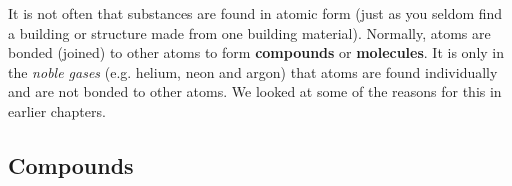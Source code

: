  \label{m38120*id307459}It is not often that substances are found in atomic form (just as you seldom find a building or structure made from one building material). Normally, atoms are bonded (joined) to other atoms to form \textbf{compounds} or \textbf{molecules}. It is only in the \textsl{noble gases} (e.g.\@{} helium, neon and argon) that atoms are found individually and are not bonded to other atoms. We looked at some of the  reasons for this in earlier chapters.
    \subsection*{Compounds}
            \nopagebreak

